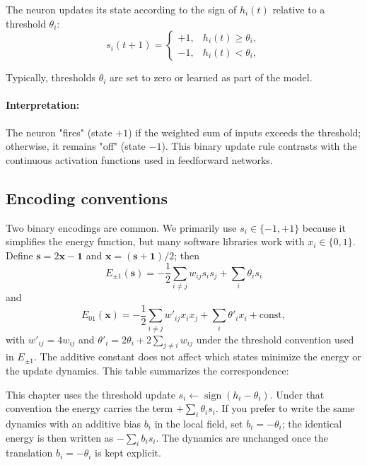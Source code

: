 The neuron updates its state according to the sign of \(h_i(t)\) relative to a threshold \(\theta_i\):
\begin{equation}
    s_i(t+1) =
    \begin{cases}
        +1, & h_i(t) \geq \theta_i, \\
        -1, & h_i(t) < \theta_i,
    \end{cases}
    \label{eq:hopfield_update_rule}
\end{equation}

Typically, thresholds \(\theta_i\) are set to zero or learned as part of the model.

\paragraph{Interpretation:} The neuron "fires" (state \(+1\)) if the weighted sum of inputs exceeds the threshold; otherwise, it remains "off" (state \(-1\)). This binary update rule contrasts with the continuous activation functions used in feedforward networks.

\subsection{Encoding conventions}
\label{sec:hopfield_encoding_conventions}

Two binary encodings are common. We primarily use \(s_i \in \{-1,+1\}\) because it simplifies the energy function, but many software libraries work with \(x_i \in \{0,1\}\). Define \(\mathbf{s} = 2\mathbf{x} - \mathbf{1}\) and \(\mathbf{x} = (\mathbf{s}+\mathbf{1})/2\); then
\[
E_{\pm1}(\mathbf{s}) = -\frac{1}{2}\sum_{i\neq j} w_{ij} s_i s_j + \sum_i \theta_i s_i
\]
and
\[
E_{01}(\mathbf{x}) = -\frac{1}{2}\sum_{i\neq j} w'_{ij} x_i x_j + \sum_i \theta'_i x_i + \text{const},
\]
with \(w'_{ij}=4w_{ij}\) and \(\theta'_i = 2\theta_i + 2\sum_{j\neq i} w_{ij}\) under the threshold convention used in \(E_{\pm1}\). The additive constant does not affect which states minimize the energy or the update dynamics. This table summarizes the correspondence:

\begin{tcolorbox}[summarybox, title={Sign convention: threshold form vs.\ bias form}]
This chapter uses the threshold update \(s_i \leftarrow \operatorname{sign}(h_i-\theta_i)\). Under that convention the energy carries the term \(+\sum_i \theta_i s_i\). If you prefer to write the same dynamics with an additive bias \(b_i\) in the local field, set \(b_i=-\theta_i\); the identical energy is then written as \(-\sum_i b_i s_i\). The dynamics are unchanged once the translation \(b_i=-\theta_i\) is kept explicit.
\end{tcolorbox}

